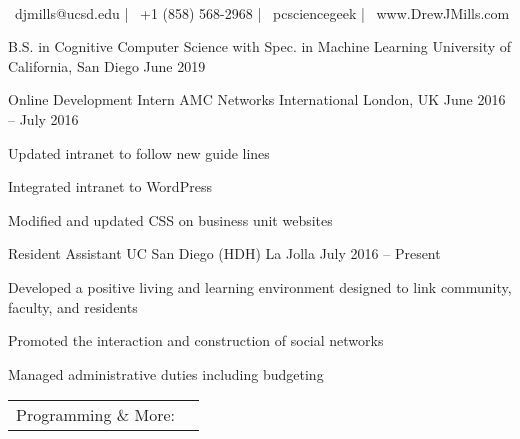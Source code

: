 \documentclass[]{awesome-cv}
\begin{document}
\begin{center}
	  \\
	\vspace{2mm}
	{\faEnvelope\ djmills@ucsd.edu} | {\faMobile\ +1 (858) 568-2968} | {\faGithub\ pcsciencegeek} | {\faLink\ www.DrewJMills.com}
\end{center}
\begin{cventries}
	\cventry
	{B.S. in Cognitive Computer Science with Spec. in Machine Learning}
	{University of California, San Diego}
	{}
	{June 2019}
	{}
\end{cventries}

\vspace{-2mm}
\begin{cventries}
	\cventry
	{Online Development Intern}
	{AMC Networks International}
	{London, UK}
	{June 2016 – July 2016}
	{\begin{cvitems}
		\item {Updated intranet to follow new guide lines}
		\item {Integrated intranet to WordPress}
		\item {Modified and updated CSS on business unit websites}
		\end{cvitems}}
	\cventry
	{Resident Assistant}
	{UC San Diego (HDH)}
	{La Jolla}
	{July 2016 – Present}
	{\begin{cvitems}
		\item {Developed a positive living and learning environment designed to link community, faculty, and residents}
		\item {Promoted the interaction and construction of social networks}
		\item {Managed administrative duties including budgeting}
		\end{cvitems}}
\end{cventries}
\begin{cventries}
	\cventry
	{}
	{\def\arraystretch{1.15}{\begin{tabular}{ l l }
		Programming \& More:  & {\skill{ Java, C, HTML, CSS, JavaScript, LaTeX, MySQL, Git, Unix Shell, Ubuntu}} \\
		\end{tabular}}}
	{}
	{}
	{}
\end{cventries}
\end{document}
